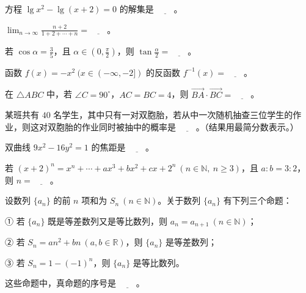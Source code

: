 \begin{question}
方程 $\lg x^2-\lg(x+2)=0$ 的解集是 $\underline{\qquad}$。

\end{question}
\begin{question}
$\displaystyle\lim_{n\to\infty}\frac{n+2}{1+2+\cdots+n}=\underline{\qquad}$。

\end{question}
\begin{question}
若 $\cos\alpha=\frac35$，且 $\alpha\in\left(0,\frac\pi2\right)$，则 $\tan\frac\alpha2=\underline{\qquad}$。

\end{question}
\begin{question}
函数 $f(x)=-x^2\ (x\in(-\infty,-2])$ 的反函数 $f^{-1}(x)=\underline{\qquad}$。

\end{question}
\begin{question}
在 $\triangle ABC$ 中，若 $\angle C=90^\circ$，$AC=BC=4$，则 $\overrightarrow{BA}\cdot\overrightarrow{BC}=\underline{\qquad}$。

\end{question}
\begin{question}
某班共有 $40$ 名学生，其中只有一对双胞胎，若从中一次随机抽查三位学生的作业，则这对双胞胎的作业同时被抽中的概率是 $\underline{\qquad}$。（结果用最简分数表示。）

\end{question}
\begin{question}
双曲线 $9x^2-16y^2=1$ 的焦距是 $\underline{\qquad}$。

\end{question}
\begin{question}
若 $(x+2)^n=x^n+\cdots+ax^3+bx^2+cx+2^n\ (n\in\mathbb N,\ n\ge3)$，且 $a:b=3:2$，则 $n=\underline{\qquad}$。

\end{question}
\begin{question}
设数列 $\{a_n\}$ 的前 $n$ 项和为 $S_n\ (n\in\mathbb N)$。关于数列 $\{a_n\}$ 有下列三个命题：

① 若 $\{a_n\}$ 既是等差数列又是等比数列，则 $a_n=a_{n+1}\ (n\in\mathbb N)$；

② 若 $S_n=an^2+bn\ (a,b\in\mathbb R)$，则 $\{a_n\}$ 是等差数列；

③ 若 $S_n=1-(-1)^n$，则 $\{a_n\}$ 是等比数列。

这些命题中，真命题的序号是 $\underline{\qquad}$。

\end{question}
